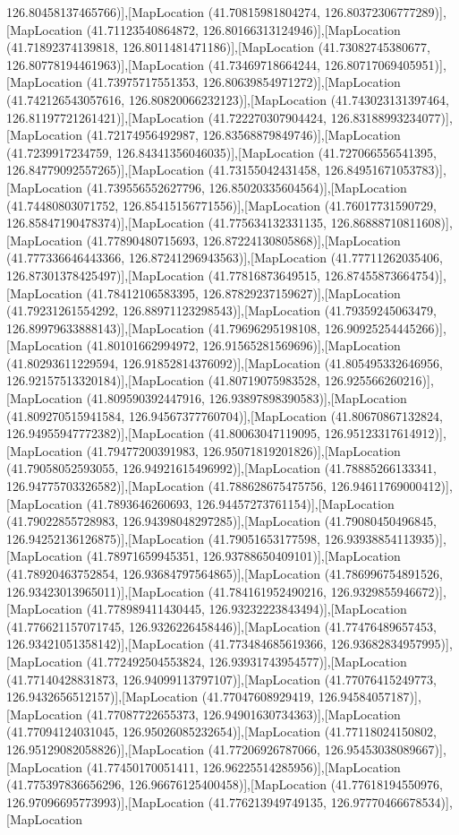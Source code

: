126.80458137465766)],[MapLocation (41.70815981804274, 126.80372306777289)],[MapLocation (41.71123540864872, 126.80166313124946)],[MapLocation (41.71892374139818, 126.8011481471186)],[MapLocation (41.73082745380677, 126.80778194461963)],[MapLocation (41.73469718664244, 126.80717069405951)],[MapLocation (41.73975717551353, 126.80639854971272)],[MapLocation (41.742126543057616, 126.80820066232123)],[MapLocation (41.743023131397464, 126.81197721261421)],[MapLocation (41.722270307904424, 126.83188993234077)],[MapLocation (41.72174956492987, 126.83568879849746)],[MapLocation (41.7239917234759, 126.84341356046035)],[MapLocation (41.727066556541395, 126.84779092557265)],[MapLocation (41.73155042431458, 126.84951671053783)],[MapLocation (41.739556552627796, 126.85020335604564)],[MapLocation (41.74480803071752, 126.85415156771556)],[MapLocation (41.76017731590729, 126.85847190478374)],[MapLocation (41.775634132331135, 126.86888710811608)],[MapLocation (41.77890480715693, 126.87224130805868)],[MapLocation (41.777336646443366, 126.87241296943563)],[MapLocation (41.77711262035406, 126.87301378425497)],[MapLocation (41.77816873649515, 126.87455873664754)],[MapLocation (41.78412106583395, 126.87829237159627)],[MapLocation (41.79231261554292, 126.88971123298543)],[MapLocation (41.79359245063479, 126.89979633888143)],[MapLocation (41.79696295198108, 126.90925254445266)],[MapLocation (41.80101662994972, 126.91565281569696)],[MapLocation (41.80293611229594, 126.91852814376092)],[MapLocation (41.805495332646956, 126.92157513320184)],[MapLocation (41.80719075983528, 126.925566260216)],[MapLocation (41.809590392447916, 126.93897898390583)],[MapLocation (41.809270515941584, 126.94567377760704)],[MapLocation (41.80670867132824, 126.94955947772382)],[MapLocation (41.80063047119095, 126.95123317614912)],[MapLocation (41.79477200391983, 126.95071819201826)],[MapLocation (41.79058052593055, 126.94921615496992)],[MapLocation (41.78885266133341, 126.94775703326582)],[MapLocation (41.788628675475756, 126.94611769000412)],[MapLocation (41.7893646260693, 126.94457273761154)],[MapLocation (41.79022855728983, 126.94398048297285)],[MapLocation (41.79080450496845, 126.94252136126875)],[MapLocation (41.79051653177598, 126.93938854113935)],[MapLocation (41.78971659945351, 126.93788650409101)],[MapLocation (41.78920463752854, 126.93684797564865)],[MapLocation (41.786996754891526, 126.93423013965011)],[MapLocation (41.784161952490216, 126.9329855946672)],[MapLocation (41.778989411430445, 126.93232223843494)],[MapLocation (41.776621157071745, 126.9326226458446)],[MapLocation (41.77476489657453, 126.93421051358142)],[MapLocation (41.773484685619366, 126.93682834957995)],[MapLocation (41.772492504553824, 126.93931743954577)],[MapLocation (41.77140428831873, 126.94099113797107)],[MapLocation (41.77076415249773, 126.9432656512157)],[MapLocation (41.77047608929419, 126.94584057187)],[MapLocation (41.77087722655373, 126.94901630734363)],[MapLocation (41.77094124031045, 126.95026085232654)],[MapLocation (41.77118024150802, 126.95129082058826)],[MapLocation (41.77206926787066, 126.95453038089667)],[MapLocation (41.77450170051411, 126.96225514285956)],[MapLocation (41.775397836656296, 126.96676125400458)],[MapLocation (41.77618194550976, 126.97096695773993)],[MapLocation (41.776213949749135, 126.97770466678534)],[MapLocation 
